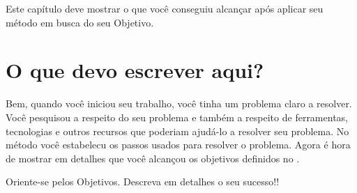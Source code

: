 \label{Resultados}
Este capítulo deve mostrar o que você conseguiu alcançar após aplicar seu método em busca do seu Objetivo.

\section{O que devo escrever aqui?}
Bem, quando você iniciou seu trabalho, você tinha um problema claro a resolver.
Você pesquisou a respeito do seu problema e também a respeito de ferramentas, tecnologias e outros recursos que poderiam ajudá-lo a resolver seu problema. No método você estabelecu os passos usados para resolver o problema. Agora é hora de mostrar em detalhes que você alcançou os objetivos definidos no .

Oriente-se pelos Objetivos. Descreva em detalhes o seu sucesso!!